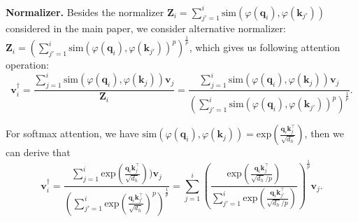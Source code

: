 


\textbf{Normalizer.} Besides the normalizer $\boldsymbol{Z}_i=\sum_{j'=1}^i\textrm{sim}(\varphi(\boldsymbol{q}_i)\textrm{,}\,\varphi(\boldsymbol{k}_{j'}))$ considered in the main paper, we consider alternative normalizer: $\boldsymbol{Z}_i=\left(\sum_{j'=1}^i\textrm{sim}(\varphi(\boldsymbol{q}_i)\textrm{,}\,\varphi(\boldsymbol{k}_{j'}))^p\right)^{\frac{1}{p}}$, which gives us following attention operation: 
\begin{equation}
\boldsymbol{v}_i^{\dagger}=\frac{\sum_{j=1}^i\textrm{sim}(\varphi(\boldsymbol{q}_i)\textrm{,}\,\varphi(\boldsymbol{k}_j))\boldsymbol{v}_j}{\boldsymbol{Z}_i}=\frac{\sum_{j=1}^i\textrm{sim}(\varphi(\boldsymbol{q}_i)\textrm{,}\,\varphi(\boldsymbol{k}_j))\boldsymbol{v}_j}{\left(\sum_{j'=1}^i\textrm{sim}(\varphi(\boldsymbol{q}_i)\textrm{,}\,\varphi(\boldsymbol{k}_{j'}))^p\right)^{\frac{1}{p}}}\textrm{.}
\end{equation}


For softmax attention, we have $\textrm{sim}(\varphi(\boldsymbol{q}_i)\textrm{,}\,\varphi(\boldsymbol{k}_j))=\textrm{exp}(\frac{\boldsymbol{q}_i\boldsymbol{k}_j^\top}{\sqrt{d_h}})$, then we can derive that
\begin{equation}
    \boldsymbol{v}_i^{\dagger}=\frac{\sum_{j=1}^i\textrm{exp}(\frac{\boldsymbol{q}_i\boldsymbol{k}_j^\top}{\sqrt{d_h}}))\boldsymbol{v}_j}{\left(\sum_{j'=1}^i\textrm{exp}(\frac{\boldsymbol{q}_i\boldsymbol{k}_{j'}^\top}{\sqrt{d_h}})^p\right)^{\frac{1}{p}}}=\sum_{j=1}^i \left(\frac{\textrm{exp}(\frac{\boldsymbol{q}_i\boldsymbol{k}_j^\top}{\sqrt{d_h}/p})}{\sum_{j'=1}^i\textrm{exp}(\frac{\boldsymbol{q}_i\boldsymbol{k}_{j'}^\top}{\sqrt{d_h}/p})}\right)^{\frac{1}{p}}\boldsymbol{v}_j\textrm{.}
\end{equation}

